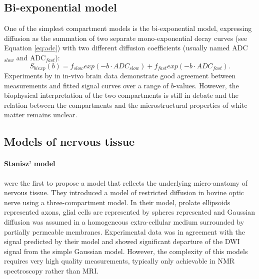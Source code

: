 \subsection*{Bi-exponential model}
One of the simplest compartment models is the bi-exponential model, expressing diffusion as the summation of two separate mono-exponential decay curves (see Equation \ref{eq:adc}) with two different diffusion coefficients (usually named \gls{ADC}$_{slow}$ and \gls{ADC}$_{fast}$):
\begin{equation}
	S_{biexp}(b) = f_{slow} exp(-b\cdot ADC_{slow}) + f_{fast} exp(-b\cdot ADC_{fast}).
\end{equation}
Experiments by \citet{Clark:2002} in in-vivo brain data demonstrate good agreement between measurements and fitted signal curves over a range of $b$-values. However, the biophysical interpretation of the two compartments is still in debate and the relation between the compartments and the microstructural properties of white matter remains unclear. 
\subsection*{Models of nervous tissue}
\paragraph*{Stanisz' model}
\cite{Stanisz:1997} were the first to propose a model that reflects the underlying micro-anatomy of nervous tissue. They introduced a model of restricted diffusion in bovine optic nerve using a three-compartment model. In their model, prolate ellipsoids represented axons, glial cells are represented by spheres represented and Gaussian diffusion was assumed in a homogeneous extra-cellular medium surrounded by partially permeable membranes. Experimental data was in agreement with the signal predicted by their model and showed significant departure of the {\gls{DWI}} signal from the simple Gaussian model. However, the complexity of this models requires very high quality measurements, typically only achievable in NMR spectroscopy rather than MRI.
